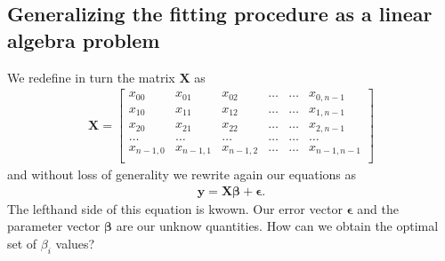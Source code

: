 \documentclass[letterpaper,10pt,english]{sphinxmanual}
\begin{document}
\subsection{Generalizing the fitting procedure as a linear algebra problem}
\label{\detokenize{chapter4:id1}}
We redefine in turn the matrix \(\boldsymbol{X}\) as
\begin{equation*}
\begin{split}
\boldsymbol{X}=
\begin{bmatrix} 
x_{00}& x_{01} &x_{02}& \dots & \dots &x_{0,n-1}\\
x_{10}& x_{11} &x_{12}& \dots & \dots &x_{1,n-1}\\
x_{20}& x_{21} &x_{22}& \dots & \dots &x_{2,n-1}\\                      
\dots& \dots &\dots& \dots & \dots &\dots\\
x_{n-1,0}& x_{n-1,1} &x_{n-1,2}& \dots & \dots &x_{n-1,n-1}\\
\end{bmatrix}
\end{split}
\end{equation*}
and without loss of generality we rewrite again  our equations as
\begin{equation*}
\begin{split}
\boldsymbol{y} = \boldsymbol{X}\boldsymbol{\beta}+\boldsymbol{\epsilon}.
\end{split}
\end{equation*}
The left\sphinxhyphen{}hand side of this equation is kwown. Our error vector \(\boldsymbol{\epsilon}\) and the parameter vector \(\boldsymbol{\beta}\) are our unknow quantities. How can we obtain the optimal set of \(\beta_i\) values?
\end{document}
